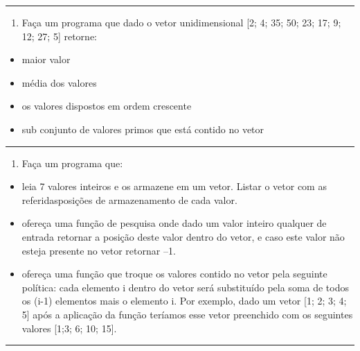 \documentclass[12pt,a4paper]{article}
\renewcommand{\linethickness}{0.05em}
\providecommand{\tightlist}{%
      \setlength{\itemsep}{0pt}\setlength{\parskip}{0pt}}
\begin{document}
    \begin{center}\rule{0.5\linewidth}{\linethickness}\end{center}

\begin{enumerate}
\def\labelenumi{\arabic{enumi}.}
\setcounter{enumi}{15}
\tightlist
\item
  Faça um programa que dado o vetor unidimensional {[}2; 4; 35; 50; 23;
  17; 9; 12; 27; 5{]} retorne:\\
\end{enumerate}

\begin{itemize}
\tightlist
\item
  maior valor
\item
  média dos valores
\item
  os valores dispostos em ordem crescente
\item
  sub conjunto de valores primos que está contido no vetor
\end{itemize}

    \begin{center}\rule{0.5\linewidth}{\linethickness}\end{center}

\begin{enumerate}
\def\labelenumi{\arabic{enumi}.}
\setcounter{enumi}{16}
\tightlist
\item
  Faça um programa que:
\end{enumerate}

\begin{itemize}
\tightlist
\item
  leia 7 valores inteiros e os armazene em um vetor. Listar o vetor com
  as referidasposições de armazenamento de cada valor.
\item
  ofereça uma função de pesquisa onde dado um valor inteiro qualquer de
  entrada retornar a posição deste valor dentro do vetor, e caso este
  valor não esteja presente no vetor retornar --1.
\item
  ofereça uma função que troque os valores contido no vetor pela
  seguinte política: cada elemento i dentro do vetor será substituído
  pela soma de todos os (i-1) elementos mais o elemento i. Por exemplo,
  dado um vetor {[}1; 2; 3; 4; 5{]} após a aplicação da função teríamos
  esse vetor preenchido com os seguintes valores {[}1;3; 6; 10; 15{]}.
\end{itemize}

    \begin{center}\rule{0.5\linewidth}{\linethickness}\end{center}
\end{document}
